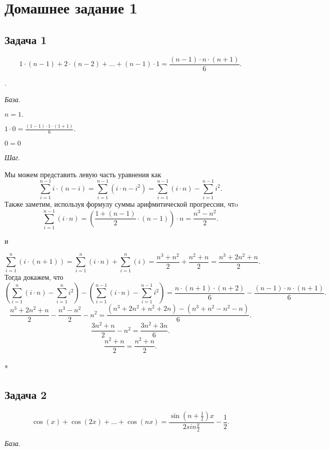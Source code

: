 

	\section{Домашнее задание 1}
	\subsection{Задача 1}
	$$
	1 \cdot (n - 1) + 2 \cdot (n -2) + \dots + (n - 1) \cdot 1 =  \frac{(n - 1)  \cdot  n \cdot (n + 1)}{6}.
	$$
	
	{.}
	
	\textit{База}.
	
	$n = 1.$
	
	$ 1 \cdot 0 = \frac{(1 - 1)  \cdot  1 \cdot (1 + 1)}{6}. $
	
	$0 = 0$
	
	\textit{Шаг}.
	
	Мы можем представить левую часть уравнения как
	 \[
		\sum_{i = 1}^{n - 1} i \cdot (n - i)= \sum_{i = 1}^{n - 1}(i \cdot n - i^2) = \sum_{i = 1}^{n - 1} (i \cdot n) - \sum_{i = 1}^{n - 1} i^2.
	\]
	Также заметим, используя формулу суммы арифмитической прогрессии, чтo
	\[
		\sum_{i = 1}^{n - 1} (i \cdot n) = \left(\frac{1 + (n-1)}{2} \cdot (n - 1)\right) \cdot n = \frac{n^3 - n^2}{2}.
	\]
	
	и 
	
	\[
		\sum_{i = 1}^{n} (i \cdot (n + 1)) = \sum_{i = 1}^{n} (i \cdot n) + \sum_{i = 1}^{n} (i) = \frac{n^3 + n^2}{2} + \frac{n^2 + n}{2} = \frac{n^3 + 2n^2 + n}{2}.
	\]
	Тогда докажем, что 
	\[     
		\left(\sum_{i = 1}^{n} (i \cdot n) - \sum_{i = 1}^{n} i^2\right) - \left(\sum_{i = 1}^{n - 1} (i \cdot n) - \sum_{i = 1}^{n - 1} i^2\right) = \frac{n \cdot  (n + 1) \cdot (n + 2)}{6} - \frac{(n - 1)  \cdot  n \cdot (n + 1)}{6}.
	\]
	\[     
		\frac{n^3 + 2n^2 + n}{2} - \frac{n^3 - n^2}{2} - n^2 = \frac{(n^3 + 2n^2 + n^2 + 2n) - (n^3 + n^2 - n^2 - n)}{6}.
	\]
	\[     
		\frac{3n^2 + n}{2} - n^2 = \frac{3n^2 + 3n}{6}.
	\]
	\[     
		\frac{n^2 + n}{2} = \frac{n^2 + n}{2}.
	\]
	\\*
	
	\subsection{Задача 2}
	\[
		\cos(x) + \cos(2x) + \dots + \cos(nx) = \frac{\sin(n+\frac{1}{2})x}{2sin\frac{x}{2}} - \frac{1}{2}.
	\]
	
	\textit{База}.
	
